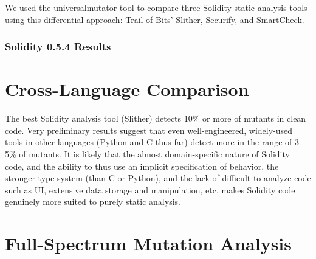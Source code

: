 \documentclass{article}
\begin{document}
We used the universalmutator tool \cite{universalmutator,regexpMut} to compare three Solidity static analysis tools using this differential approach: Trail of Bits' Slither, Securify, and SmartCheck.

\subsubsection{Solidity 0.5.4 Results}

\section{Cross-Language Comparison}

The best Solidity analysis tool (Slither) detects 10\% or more of mutants in clean code.   Very preliminary results suggest that even well-engineered, widely-used tools in other languages (Python and C thus far) detect more in the range of 3-5\% of mutants.  It is likely that the almost domain-specific nature of Solidity code, and the ability to thus use an implicit specification of behavior, the stronger type system (than C or Python), and the lack of difficult-to-analyze code such as UI, extensive data storage and manipulation, etc. makes Solidity code genuinely more suited to purely static analysis.

\section{Full-Spectrum Mutation Analysis}



\end{document}
